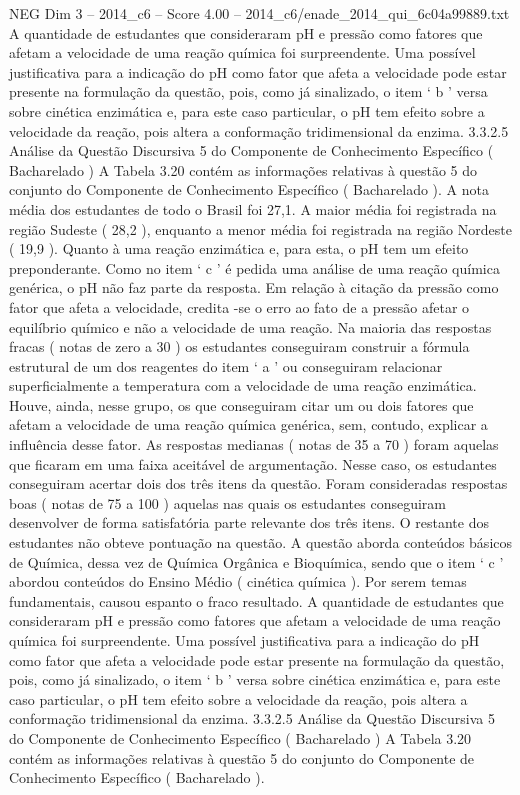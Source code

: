 \begin{textsample}{NEG Dim 3 – 2014\_c6 – Score 4.00 – 2014\_c6/enade\_2014\_qui\_6c04a99889.txt}
A quantidade de estudantes que consideraram pH e pressão como fatores que afetam a velocidade de uma reação química foi surpreendente.
Uma possível justificativa para a indicação do pH como fator que afeta a velocidade pode estar presente na formulação da questão, pois, como já sinalizado, o item ‘ b ’ versa sobre cinética enzimática e, para este caso particular, o pH tem efeito sobre a velocidade da reação, pois altera a conformação tridimensional da enzima. 3.3.2.5 Análise da Questão Discursiva 5 do Componente de Conhecimento Específico ( Bacharelado ) A Tabela 3.20 contém as informações relativas à questão 5 do conjunto do Componente de Conhecimento Específico ( Bacharelado ).
A nota média dos estudantes de todo o Brasil foi 27,1.
A maior média foi registrada na região Sudeste ( 28,2 ), enquanto a menor média foi registrada na região Nordeste ( 19,9 ).
Quanto à uma reação enzimática e, para esta, o pH tem um efeito preponderante.
Como no item ‘ c ’ é pedida uma análise de uma reação química genérica, o pH não faz parte da resposta.
Em relação à citação da pressão como fator que afeta a velocidade, credita -se o erro ao fato de a pressão afetar o equilíbrio químico e não a velocidade de uma reação.
Na maioria das respostas fracas ( notas de zero a 30 ) os estudantes conseguiram construir a fórmula estrutural de um dos reagentes do item ‘ a ’ ou conseguiram relacionar superficialmente a temperatura com a velocidade de uma reação enzimática.
Houve, ainda, nesse grupo, os que conseguiram citar um ou dois fatores que afetam a velocidade de uma reação química genérica, sem, contudo, explicar a influência desse fator.
As respostas medianas ( notas de 35 a 70 ) foram aquelas que ficaram em uma faixa aceitável de argumentação.
Nesse caso, os estudantes conseguiram acertar dois dos três itens da questão.
Foram consideradas respostas boas ( notas de 75 a 100 ) aquelas nas quais os estudantes conseguiram desenvolver de forma satisfatória parte relevante dos três itens.
O restante dos estudantes não obteve pontuação na questão.
A questão aborda conteúdos básicos de Química, dessa vez de Química Orgânica e Bioquímica, sendo que o item ‘ c ’ abordou conteúdos do Ensino Médio ( cinética química ).
Por serem temas fundamentais, causou espanto o fraco resultado.
A quantidade de estudantes que consideraram pH e pressão como fatores que afetam a velocidade de uma reação química foi surpreendente.
Uma possível justificativa para a indicação do pH como fator que afeta a velocidade pode estar presente na formulação da questão, pois, como já sinalizado, o item ‘ b ’ versa sobre cinética enzimática e, para este caso particular, o pH tem efeito sobre a velocidade da reação, pois altera a conformação tridimensional da enzima. 3.3.2.5 Análise da Questão Discursiva 5 do Componente de Conhecimento Específico ( Bacharelado ) A Tabela 3.20 contém as informações relativas à questão 5 do conjunto do Componente de Conhecimento Específico ( Bacharelado ).

\end{textsample}
